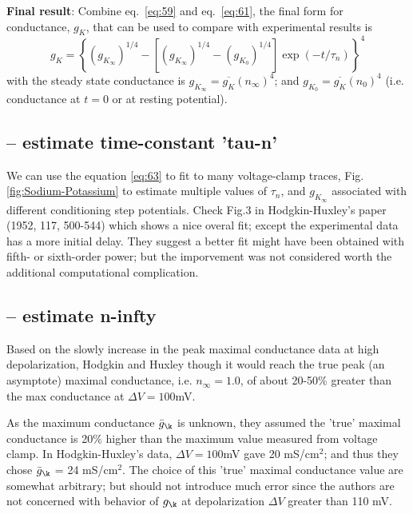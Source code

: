 {\bf Final result}: Combine eq.~\eqref{eq:59} and eq.~\eqref{eq:61}, the final
form for  conductance, $g_K$, that can be used to compare with
experimental results is
\begin{equation}
  \label{eq:63}
  g_K = \left\{ (g_{K_\infty})^{1/4} - [ (g_{K_\infty})^{1/4} -  (g_{K_0})^{1/4} ] \exp(-t/\tau_n)        \right\}^4
\end{equation}
with the steady state  conductance is $g_{K_\infty} =
\overline{g_K}(n_\infty)^{4}$; and $g_{K_0} = \overline{g_K}(n_0)^{4}$ (i.e. 
conductance at $t=0$ or at resting potential).


\subsection{-- estimate time-constant 'tau-n'}
\label{sec:Hodgkin-Huxley-estimate-time-constant-tau_n}

We can use the equation \ref{eq:63} to fit to many voltage-clamp traces,
Fig.\ref{fig:Sodium-Potassium} to estimate multiple values of $\tau_n$, and
$g_{K_\infty}$  associated with different conditioning step potentials.
Check Fig.3 in Hodgkin-Huxley's paper (1952, 117, 500-544) which shows a nice
overal fit; except the experimental data has a more initial delay. They suggest
a better fit might have been obtained with fifth- or sixth-order power; but the
imporvement was not considered worth the additional computational complication.

\subsection{-- estimate n-infty}
\label{sec:Hodgkin-Huxley-estimate-n-infty}

Based on the slowly increase in  the peak maximal conductance data at high
depolarization, Hodgkin and Huxley though it would reach the true peak (an
asymptote) maximal conductance, i.e. $n_\infty = 1.0$, of about 20-50\% greater
than the max conductance at $\Delta V=100$mV.

As the maximum conductance $\bar{g}_{\k}$ is unknown, they assumed the 'true'
maximal conductance is 20\% higher than the maximum value measured from voltage
clamp. In Hodgkin-Huxley's data, $\Delta V=100$mV gave 20 mS/cm$^2$; and thus
they chose $\bar{g}_{\k}$ = 24 mS/cm$^2$.
The choice of this 'true' maximal conductance value are somewhat arbitrary; but
should not introduce much error since the authors are not concerned with
behavior of $g_{\k}$ at depolarization $\Delta V$ greater than 110 mV.


